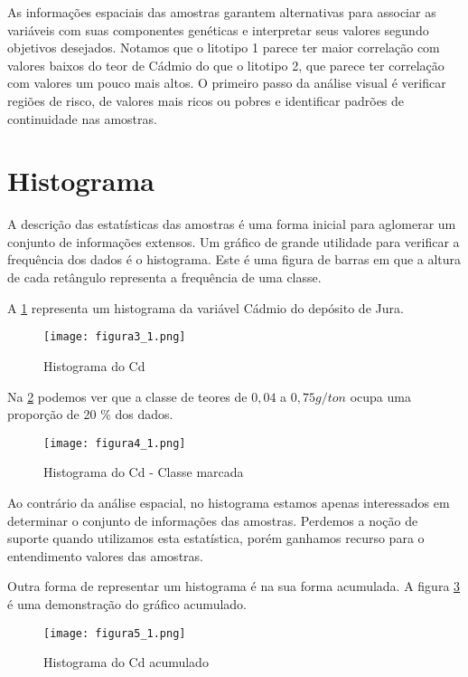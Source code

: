 As informações espaciais das amostras garantem alternativas para associar as variáveis com suas componentes genéticas e interpretar seus valores segundo objetivos desejados. Notamos que o litotipo 1 parece ter maior correlação com valores baixos do teor de Cádmio do que o litotipo 2, que parece ter correlação com valores um pouco mais altos. O primeiro passo da análise visual é verificar regiões de risco, de valores mais ricos ou pobres e identificar padrões de continuidade nas amostras.  

\section{Histograma}

A descrição das estatísticas das amostras é uma forma inicial para aglomerar um conjunto de informações extensos. Um gráfico de grande utilidade para verificar a frequência dos dados é o histograma. Este é uma figura de barras em que a altura de cada retângulo representa a frequência de uma classe.

 A \ref{Fig3_1} representa um histograma da variável Cádmio do depósito de Jura.  

\begin{spacing}{1.0}
\begin{figure}[H]
\centering
\texttt{[image: figura3\_1.png]}	
\caption{Histograma do Cd}
\label{Fig3_1}
\end{figure}
\end{spacing}

Na \ref{Fig4_1} podemos ver que a classe de teores de $0,04$ a $0,75g/ton$ ocupa uma proporção de 20 \% dos dados.


\begin{figure}[H]
\centering
\texttt{[image: figura4\_1.png]}	
\caption{Histograma do Cd - Classe marcada}
\label{Fig4_1}
\end{figure}


Ao contrário da análise espacial, no histograma estamos apenas interessados em determinar o conjunto de informações das amostras. Perdemos a noção de suporte quando utilizamos esta estatística, porém ganhamos recurso para o entendimento valores das amostras. 

Outra forma de representar um histograma é na sua forma acumulada. A figura \ref{Fig5_1} é uma demonstração do gráfico acumulado. 

\begin{figure}[H]
\texttt{[image: figura5\_1.png]}	
\caption{Histograma do Cd acumulado}
\label{Fig5_1}
\end{figure}

